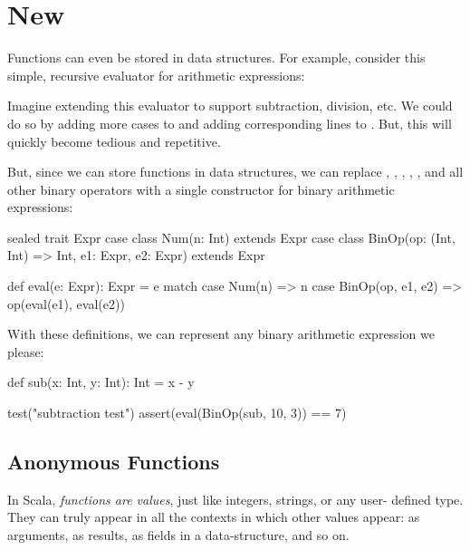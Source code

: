 \documentclass{book}
\begin{document}

\section{New}


Functions can even be stored in data structures. For example, consider
this simple, recursive evaluator for arithmetic expressions:


Imagine extending this evaluator to support subtraction, division, etc.
We could do so by adding more cases to  and adding corresponding
lines to . But, this will quickly become tedious and repetitive.

But, since we can store functions in data structures, we can replace
, , , , , and all other binary operators with
a single constructor for binary arithmetic expressions:

\begin{scalacode}
sealed trait Expr
case class Num(n: Int) extends Expr
case class BinOp(op: (Int, Int) => Int, e1: Expr, e2: Expr) extends Expr

def eval(e: Expr): Expr = e match {
  case Num(n) => n
  case BinOp(op, e1, e2) => op(eval(e1), eval(e2))
}
\end{scalacode}

With these definitions, we can represent any binary arithmetic expression
we please:

\begin{scalacode}
def sub(x: Int, y: Int): Int = x - y

test("subtraction test") {
  assert(eval(BinOp(sub, 10, 3)) == 7)
}
\end{scalacode}

\subsection{Anonymous Functions}

In Scala, \emph{functions are values}, just like integers, strings, or any user-
defined type. They can truly appear in all the contexts in which other values
appear: as arguments, as results, as fields in a data-structure, and so on.
\end{document}
